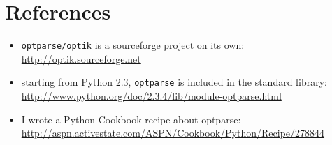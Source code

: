 \documentclass[10pt,a4paper,english]{article}
\begin{document}

\hypertarget{references}{}
\section*{References}
\begin{itemize}
\item {} 
\texttt{optparse/optik} is a sourceforge project on its own:  
\href{http://optik.sourceforge.net}{http://optik.sourceforge.net}

\item {} 
starting from Python 2.3, \texttt{optparse} is included in the standard library:
\href{http://www.python.org/doc/2.3.4/lib/module-optparse.html}{http://www.python.org/doc/2.3.4/lib/module-optparse.html}

\item {} 
I wrote a Python Cookbook recipe about optparse:
\href{http://aspn.activestate.com/ASPN/Cookbook/Python/Recipe/278844}{http://aspn.activestate.com/ASPN/Cookbook/Python/Recipe/278844}

\end{itemize}
\end{document}
